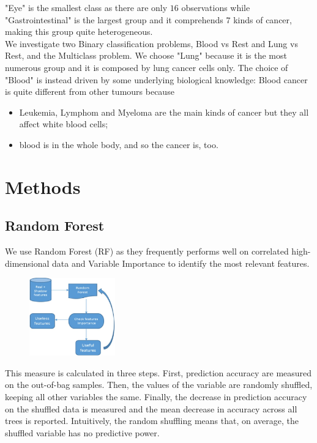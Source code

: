 \documentclass[a4paper,11pt, oneside]{article}  %
\begin{document}
"Eye" is the smallest class as there are only $16$ observations while "Gastrointestinal" is the largest group and it comprehends $7$ kinds of cancer,  making this group quite heterogeneous. \\
We investigate two Binary classification problems,  Blood vs Rest and Lung vs Rest, and the Multiclass problem. We choose "Lung" because it is the most numerous group and it is composed by lung cancer cells only.  The choice of "Blood" is instead driven by some underlying biological knowledge: Blood cancer is quite different from other tumours because
\begin{itemize}
	\item Leukemia, Lymphom and Myeloma are the main kinds of cancer but they all affect white blood cells;
	\item blood is in the whole body, and so the cancer is, too.
\end{itemize} 

\section{Methods}
\subsection{Random Forest}
We use Random Forest (RF) as they frequently performs well on correlated high-dimensional data and Variable Importance to identify the most relevant features.  

\begin{figure}
	\includegraphics[width=0.33\textwidth]{Boruta-Algorithm.jpg}
	\label{fig2}
\end{figure}

This measure is calculated in three steps.  First, prediction accuracy are measured on the out-of-bag samples. Then, the values of the variable are randomly shuffled, keeping all other variables the same.  Finally, the decrease in prediction accuracy on the shuffled data is measured and the mean decrease in accuracy across all trees is reported.  Intuitively, the random shuffling means that, on average, the shuffled variable has no predictive power. 
\end{document}
